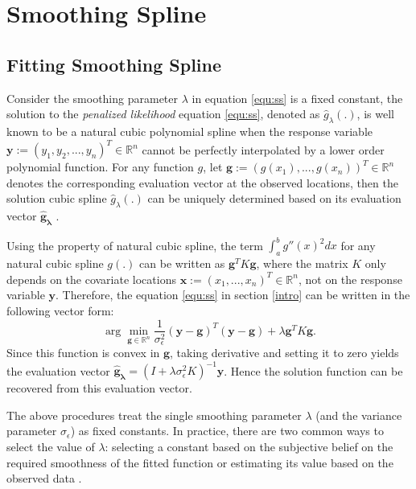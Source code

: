 \documentclass{article}
\begin{document}
\section{Smoothing Spline}\label{SmoothSpline}

\subsection{Fitting Smoothing Spline}

Consider the smoothing parameter $\lambda$ in equation \ref{equ:ss} is a fixed constant, the solution to the \textit{penalized likelihood} equation \ref{equ:ss}, denoted as $\hat{g}_\lambda(.)$, is well known to be a natural cubic polynomial spline when the response variable $\boldsymbol{y}:= (y_1, y_2, ..., y_n)^T \in \mathbb{R}^n$ cannot be perfectly interpolated by a lower order polynomial function. For any function $g$, let $\boldsymbol{g} := (g(x_1), ..., g(x_n))^T \in \mathbb{R}^n$ denotes the corresponding evaluation vector at the observed locations, then the solution cubic spline $\hat{g}_\lambda(.)$ can be uniquely determined based on its evaluation vector $\boldsymbol{\hat{g}_\lambda}$ \citep{smoothingspline}. 



Using the property of natural cubic spline, the term $\int_a^b g''(x)^2 dx$ for any natural cubic spline $g(.)$ can be written as $\boldsymbol{g}^T K \boldsymbol{g}$, where the matrix $K$ only depends on the covariate locations $\boldsymbol{x} := (x_1, ..., x_n)^T \in \mathbb{R}^n$, not on the response variable $\boldsymbol{y}$. Therefore, the equation \ref{equ:ss} in section \ref{intro} can be written in the following vector form:
\begin{equation}\label{equ:vectorss}
\arg\min_{\boldsymbol{g}\in \mathbb{R}^n} \frac{1}{ \sigma_\epsilon^2}(\boldsymbol{y} - \boldsymbol{g})^T (\boldsymbol{y} - \boldsymbol{g}) + \lambda \boldsymbol{g}^T K \boldsymbol{g}.
\end{equation}
Since this function is convex in $\boldsymbol{g}$, taking derivative and setting it to zero yields the evaluation vector $\boldsymbol{\hat{g}_\lambda} = (I+\lambda \sigma_\epsilon^2 K)^{-1} \boldsymbol{y}$. Hence the solution function can be recovered from this evaluation vector. 

The above procedures treat the single smoothing parameter $\lambda$ (and the variance parameter $\sigma_\epsilon$) as fixed constants. In practice, there are two common ways to select the value of $\lambda$: selecting a constant based on the subjective belief on the required smoothness of the fitted function or estimating its value based on the observed data \citep{smoothingspline}. 
\end{document}
